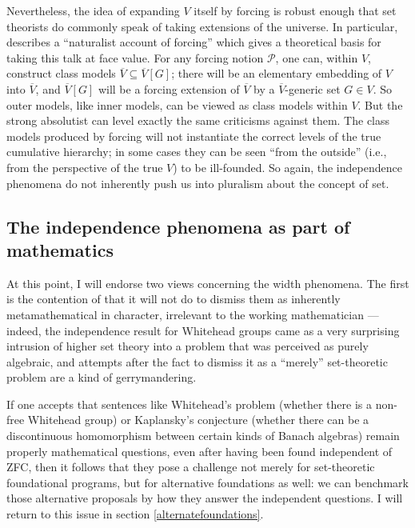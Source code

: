 \documentclass[letterpaper,12pt]{article}
\begin{document}
Nevertheless, the idea of expanding $V$ itself by forcing is robust enough that set theorists do commonly speak of taking extensions of the universe. In particular, \cite{hamkins2011set} describes a ``naturalist account of forcing'' which gives a theoretical basis for taking this talk at face value. For any forcing notion $\mathcal{P}$, one can, within $V$, construct class models $\overline{V} \subseteq \overline{V}[G]$; there will be an elementary embedding of $V$ into $\overline{V}$, and $\overline{V}[G]$ will be a forcing extension of $\overline{V}$ by a $\overline{V}$-generic set $G \in V$. So outer models, like inner models, can be viewed as class models within $V$. But the strong absolutist can level exactly the same criticisms against them. The class models produced by forcing will not instantiate the correct levels of the true cumulative hierarchy; in some cases they can be seen ``from the outside'' (i.e., from the perspective of the true $V$) to be ill-founded. So again, the independence phenomena do not inherently push us into pluralism about the concept of set.

\subsection{The independence phenomena as part of mathematics}
\label{independenceismath}
At this point, I will endorse two views concerning the width phenomena. The first is the contention of \cite{magidor2012some} that it will not do to dismiss them as inherently metamathematical in character, irrelevant to the working mathematician --- indeed, the independence result for Whitehead groups came as a very surprising intrusion of higher set theory into a problem that was perceived as purely algebraic, and attempts after the fact to dismiss it as a ``merely'' set-theoretic problem are a kind of gerrymandering.

If one accepts that sentences like Whitehead's problem (whether there is a non-free Whitehead group) or Kaplansky's conjecture (whether there can be a discontinuous homomorphism between certain kinds of Banach algebras) remain properly mathematical questions, even after having been found independent of ZFC, then it follows that they pose a challenge not merely for set-theoretic foundational programs, but for alternative foundations as well: we can benchmark those alternative proposals by how they answer the independent questions. I will return to this issue in section \ref{alternatefoundations}.
\end{document}
